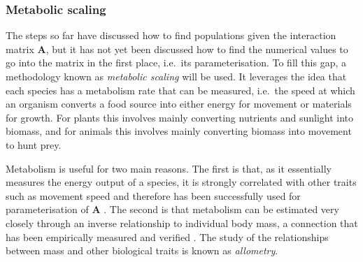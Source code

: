 


\subsubsection{Metabolic scaling}
The steps so far have discussed how to find populations given the interaction matrix $\mathbf{A}$, but it has not yet been discussed how to find the numerical values to go into the matrix in the first place, i.e.\ its parameterisation.
To fill this gap, a methodology known as \emph{metabolic scaling} will be used. It leverages the idea that each species has a metabolism rate that can be measured, i.e.\ the speed at which an organism converts a food source into either energy for movement or materials for growth. For plants this involves mainly converting nutrients and sunlight into biomass, and for animals this involves mainly converting biomass into movement to hunt prey.

Metabolism is useful for two main reasons. The first is that, as it essentially measures the energy output of a species, it is strongly correlated with other traits such as movement speed \cite{Hirt2017} and therefore has been successfully used for parameterisation of $\mathbf{A}$ \cite{Savage2004, Vucic-Pestic2010, Pawar2015}. The second is that metabolism can be estimated very closely through an inverse relationship to individual body mass, a connection that has been empirically measured and verified \cite{Brown2004}. The study of the relationships between mass and other biological traits is known as \emph{allometry}.

